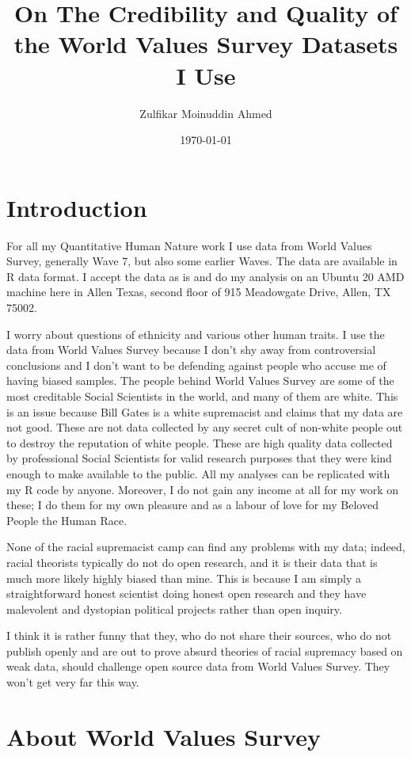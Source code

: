 \documentclass{amsart}
\title{On The Credibility and Quality of the World Values Survey Datasets I Use}
\author{Zulfikar Moinuddin Ahmed}
\date{\today}
\begin{document}
\maketitle

\section{Introduction}

For all my Quantitative Human Nature work I use data from World Values Survey, generally Wave 7, but also some earlier Waves.  The data are available in R data format.  I accept the data as is and do my analysis on an Ubuntu 20 AMD machine here in Allen Texas, second floor of 915 Meadowgate Drive, Allen, TX 75002.  

I worry about questions of ethnicity and various other human traits.  I use the data from World Values Survey because I don't shy away from controversial conclusions and I don't want to be defending against people who accuse me of having biased samples.  The people behind World Values Survey are some of the most creditable Social Scientists in the world, and many of them are white.  This is an issue because Bill Gates is a white supremacist and claims that my data are not good.  These are not data collected by any secret cult of non-white people out to destroy the reputation of white people.  These are high quality data collected by professional Social Scientists for valid research purposes that they were kind enough to make available to the public.  All my analyses can be replicated with my R code by anyone.  Moreover, I do not gain any income at all for my work on these; I do them for my own pleasure and as a labour of love for my Beloved People the Human Race.

None of the racial supremacist camp can find any problems with my data; indeed, racial theorists typically do not do open research, and it is their data that is much more likely highly biased than mine. This is because I am simply a straightforward honest scientist doing honest open research and they have malevolent and dystopian political projects rather than open inquiry.  

I think it is rather funny that they, who do not share their sources, who do not publish openly and are out to prove absurd theories of racial supremacy based on weak data, should challenge open source data from World Values Survey.  They won't get very far this way. 

\section{About World Values Survey}
\end{document}
